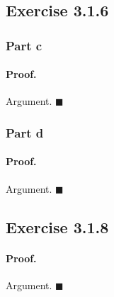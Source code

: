 \documentclass[paper=a4, fontsize=11pt]{scrartcl} %
\numberwithin{equation}{section} %
\numberwithin{figure}{section} %
\numberwithin{table}{section} %
\begin{document}
\subsection*{Exercise 3.1.6}
\subsubsection*{Part c}
\paragraph{Proof.} Argument. $\blacksquare$\\
\subsubsection*{Part d}
\paragraph{Proof.} Argument. $\blacksquare$\\

\subsection*{Exercise 3.1.8}
\paragraph{Proof.} Argument. $\blacksquare$\\
\end{document}
